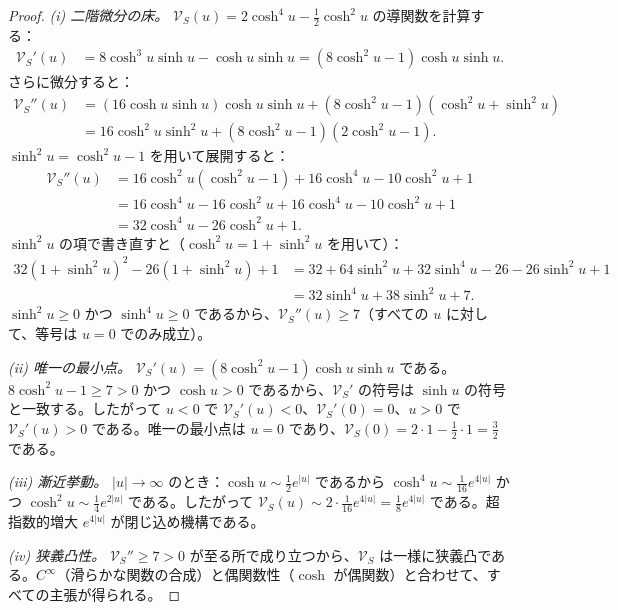 \documentclass[12pt]{article}
\theoremstyle{plain}
\theoremstyle{definition}
\numberwithin{equation}{section}
\begin{document}
\begin{proof}
\emph{(i) 二階微分の床。}
$\mathcal{V}_S(u)=2\cosh^4 u-\frac{1}{2}\cosh^2 u$ の導関数を計算する：
\begin{align}
\mathcal{V}_S'(u) &= 8\cosh^3 u\sinh u-\cosh u\sinh u = (8\cosh^2 u-1)\cosh u\sinh u.
\end{align}
さらに微分すると：
\begin{align}
\mathcal{V}_S''(u) &= (16\cosh u\sinh u)\cosh u\sinh u+(8\cosh^2 u-1)(\cosh^2 u+\sinh^2 u)\\
&= 16\cosh^2 u\sinh^2 u+(8\cosh^2 u-1)(2\cosh^2 u-1).
\end{align}
$\sinh^2 u=\cosh^2 u-1$ を用いて展開すると：
\begin{align}
\mathcal{V}_S''(u) &= 16\cosh^2 u(\cosh^2 u-1)+16\cosh^4 u-10\cosh^2 u+1\\
&= 16\cosh^4 u-16\cosh^2 u+16\cosh^4 u-10\cosh^2 u+1\\
&= 32\cosh^4 u-26\cosh^2 u+1.
\end{align}
$\sinh^2 u$ の項で書き直すと（$\cosh^2 u=1+\sinh^2 u$ を用いて）：
\begin{align}
32(1+\sinh^2 u)^2-26(1+\sinh^2 u)+1 &= 32+64\sinh^2 u+32\sinh^4 u-26-26\sinh^2 u+1\\
&= 32\sinh^4 u+38\sinh^2 u+7.
\end{align}
$\sinh^2 u\geq 0$ かつ $\sinh^4 u\geq 0$ であるから、$\mathcal{V}_S''(u)\geq 7$（すべての $u$ に対して、等号は $u=0$ でのみ成立）。

\emph{(ii) 唯一の最小点。}
$\mathcal{V}_S'(u)=(8\cosh^2 u-1)\cosh u\sinh u$ である。$8\cosh^2 u-1\geq 7>0$ かつ $\cosh u>0$ であるから、$\mathcal{V}_S'$ の符号は $\sinh u$ の符号と一致する。したがって $u<0$ で $\mathcal{V}_S'(u)<0$、$\mathcal{V}_S'(0)=0$、$u>0$ で $\mathcal{V}_S'(u)>0$ である。唯一の最小点は $u=0$ であり、$\mathcal{V}_S(0)=2\cdot 1-\frac{1}{2}\cdot 1=\frac{3}{2}$ である。

\emph{(iii) 漸近挙動。}
$|u|\to\infty$ のとき：$\cosh u\sim\frac{1}{2}e^{|u|}$ であるから $\cosh^4 u\sim\frac{1}{16}e^{4|u|}$ かつ $\cosh^2 u\sim\frac{1}{4}e^{2|u|}$ である。したがって $\mathcal{V}_S(u)\sim 2\cdot\frac{1}{16}e^{4|u|}=\frac{1}{8}e^{4|u|}$ である。超指数的増大 $e^{4|u|}$ が閉じ込め機構である。

\emph{(iv) 狭義凸性。}
$\mathcal{V}_S''\geq 7>0$ が至る所で成り立つから、$\mathcal{V}_S$ は一様に狭義凸である。$C^\infty$（滑らかな関数の合成）と偶関数性（$\cosh$ が偶関数）と合わせて、すべての主張が得られる。
\end{proof}
\end{document}
